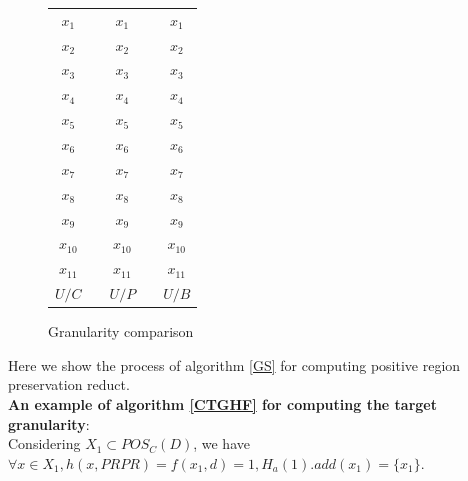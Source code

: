 \documentclass[review]{elsarticle}
\begin{document}
		\begin{figure}[htb]
			\begin{center}
			\begin{tabular}{ccccc}
				\cellcolor{SeaGreen!60}$x_1$    &  &\cellcolor{SeaGreen!60} $x_1$        &  &\cellcolor{SeaGreen!60} $x_1$    \\
				\cellcolor{LightBlue!80}$x_2$    &  &\cellcolor{LightBlue!80} $x_2$        &  &\cellcolor{LightBlue!80} $x_2$    \\
				\cellcolor{LightYellow2!80}$x_3$    &  &\cellcolor{LightYellow2!80} $x_3$        &  &\cellcolor{LightYellow2!80} $x_3$    \\
				\cellcolor{LightYellow2!80}$x_4$    &  &\cellcolor{LightYellow2!80} $x_4$        &  &\cellcolor{LightYellow2!80} $x_4$    \\
				\cellcolor{Orange!40}$x_5$    &  &\cellcolor{LightYellow2!80} $x_5$        &  &\cellcolor{LightYellow2!80} $x_5$    \\
				\cellcolor{Orange!40}$x_6$    &  &\cellcolor{LightYellow2!80} $x_6$        &  &\cellcolor{LightYellow2!80} $x_6$    \\
				\cellcolor{brown!35}$x_7$    &  &\cellcolor{LightYellow2!80} $x_7$        &  &\cellcolor{LightYellow2!80} $x_7$    \\
				\cellcolor{brown!35}$x_8$    &  &\cellcolor{LightYellow2!80} $x_8$        &  &\cellcolor{LightYellow2!80} $x_8$    \\
				\cellcolor{brown!35}$x_9$    &  &\cellcolor{LightYellow2!80} $x_9$        &  &\cellcolor{LightYellow2!80} $x_9$    \\
				\cellcolor{DarkKhaki!70}$x_{10}$ &  &\cellcolor{LightYellow2!80} $x_{10}$     &  &\cellcolor{LightYellow2!80} $x_{10}$ \\
				\cellcolor{DarkKhaki!70}$x_{11}$ &  &\cellcolor{LightYellow2!80} $x_{11}$     &  &\cellcolor{LightYellow2!80} $x_{11}$ \\
				$U/C$    &  & $U/P$ &  & $U/B$   
			\end{tabular}
			\end{center}
		\caption{Granularity comparison}\label{GSComparison}
		\end{figure}
		\par Here we show the process of algorithm \ref{GS} for computing positive region preservation reduct.
		\\\textbf{An example of algorithm \ref{CTGHF} for computing the target granularity}:\\
		Considering $X_1 \subset POS_C(D)$, we have $\forall x \in X_1, h(x,PRPR)=f(x_1,d)=1, H_a(1).add(x_1)=\{x_1\}$.\\
\end{document}
